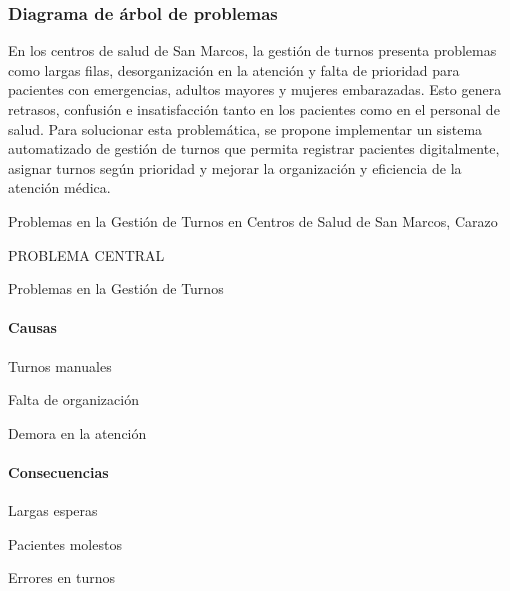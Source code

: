 \subsubsection{Diagrama de árbol de problemas}

En los centros de salud de San Marcos, la gestión de turnos presenta problemas como largas filas, desorganización en la atención y falta de prioridad para pacientes con emergencias, adultos mayores y mujeres embarazadas. Esto genera retrasos, confusión e insatisfacción tanto en los pacientes como en el personal de salud. Para solucionar esta problemática, se propone implementar un sistema automatizado de gestión de turnos que permita registrar pacientes digitalmente, asignar turnos según prioridad y mejorar la organización y eficiencia de la atención médica.

Problemas en la Gestión de Turnos en Centros de Salud de San Marcos, Carazo

PROBLEMA CENTRAL

Problemas en la Gestión de Turnos

\paragraph{Causas}

Turnos manuales

Falta de organización

Demora en la atención

\paragraph{Consecuencias}

Largas esperas

Pacientes molestos

Errores en turnos
